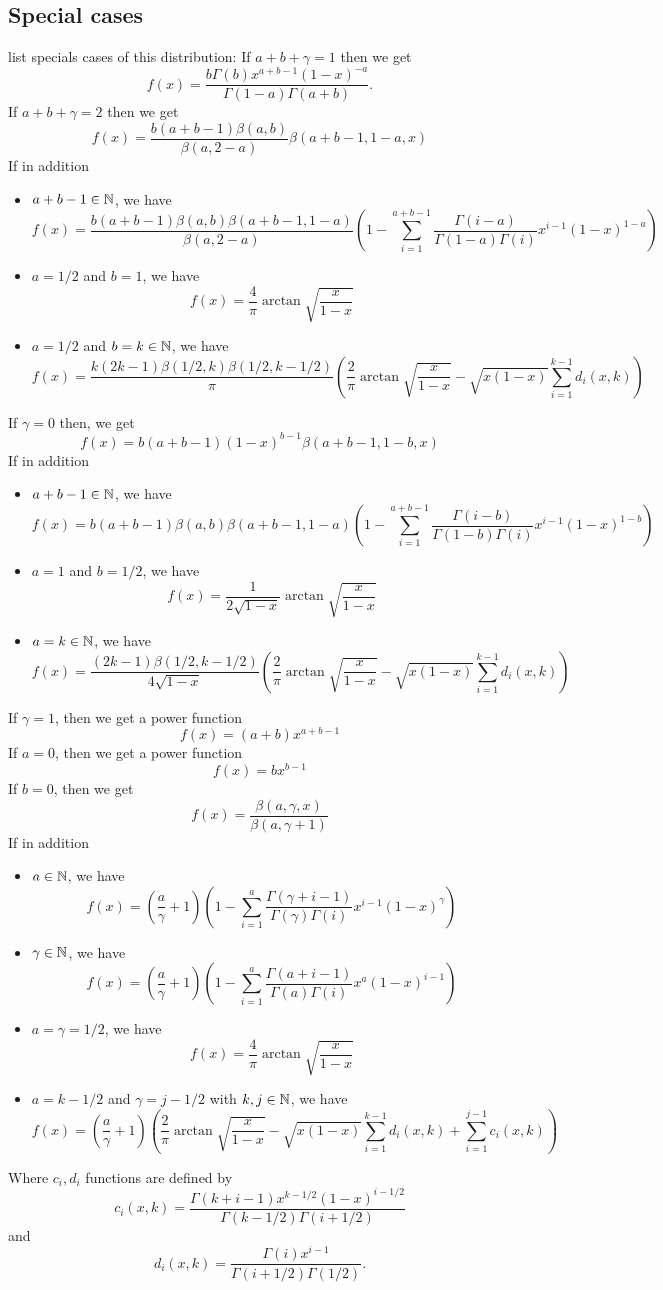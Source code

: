 \subsection{Special cases}
\cite{kotznadara} list specials cases of this distribution:
If $a+b+\gamma=1$ then we get 
$$
f(x) = \frac{b\Gamma(b)x^{a+b-1}(1-x)^{-a}}{\Gamma(1-a)\Gamma(a+b)}.
$$
If $a+b+\gamma=2$ then we get
$$
f(x) = \frac{b(a+b-1)\beta(a,b)}{\beta(a,2-a)}\beta(a+b-1,1-a,x)
$$
If in addition
\begin{itemize}
\item  $a+b-1\in\mathbb N$, we have
$$
f(x) = \frac{b(a+b-1)\beta(a,b)\beta(a+b-1,1-a)}{\beta(a,2-a)} \left(1- \sum_{i=1}^{a+b-1}\frac{\Gamma(i-a)}{\Gamma(1-a)\Gamma(i)} x^{i-1}(1-x)^{1-a} \right)
$$
\item  $a=1/2$ and $b=1$, we have
$$
f(x) = \frac{4}{\pi}\arctan\sqrt{\frac{x}{1-x}}
$$
\item  $a=1/2$ and $b=k\in\mathbb N$, we have
$$
f(x) = \frac{k(2k-1)\beta(1/2,k)\beta(1/2,k-1/2)}{\pi}\left(\frac{2}{\pi}\arctan\sqrt{\frac{x}{1-x}} -\sqrt{x(1-x)}\sum_{i=1}^{k-1}d_i(x,k) \right)
$$
\end{itemize}
If $\gamma=0$ then, we get
$$
f(x) = b(a+b-1)(1-x)^{b-1}\beta(a+b-1,1-b,x)
$$
If in addition
\begin{itemize}
\item  $a+b-1\in\mathbb N$, we have
$$
f(x) = b(a+b-1)\beta(a,b)\beta(a+b-1,1-a) \left(1- \sum_{i=1}^{a+b-1}\frac{\Gamma(i-b)}{\Gamma(1-b)\Gamma(i)} x^{i-1}(1-x)^{1-b} \right)
$$
\item $a=1$ and $b=1/2$, we have
$$
f(x) = \frac{1}{2\sqrt{1-x}}\arctan\sqrt{\frac{x}{1-x}}
$$
\item $a=k\in\mathbb N$, we have
$$
f(x) = \frac{(2k-1)\beta(1/2,k-1/2)}{4\sqrt{1-x}}\left(\frac{2}{\pi}\arctan\sqrt{\frac{x}{1-x}} -\sqrt{x(1-x)}\sum_{i=1}^{k-1}d_i(x,k) \right)
$$
\end{itemize}
If $\gamma=1$, then we get a power function
$$
f(x) = (a+b)x^{a+b-1}
$$
If $a=0$, then we get a power function 
$$
f(x) = bx^{b-1}
$$
If $b=0$, then we get
$$
f(x) = \frac{\beta(a,\gamma,x)}{\beta(a,\gamma+1)}
$$
If in addition
\begin{itemize}
\item  $a\in\mathbb N$, we have
$$
f(x) = \left(\frac{a}{\gamma}+1\right)\left( 1-\sum_{i=1}^a\frac{\Gamma(\gamma+i-1)}{\Gamma(\gamma)\Gamma(i)}x^{i-1}(1-x)^{\gamma} \right)
$$
\item  $\gamma\in\mathbb N$, we have
$$
f(x) = \left(\frac{a}{\gamma}+1\right)\left( 1-\sum_{i=1}^a\frac{\Gamma(a+i-1)}{\Gamma(a)\Gamma(i)}x^a(1-x)^{i-1} \right)
$$
\item $a=\gamma=1/2$, we have
$$
f(x) = \frac{4}{\pi}\arctan\sqrt{\frac{x}{1-x}}
$$
\item $a=k-1/2$ and $\gamma=j-1/2$ with $k,j\in\mathbb N$, we have
$$
f(x) = \left(\frac{a}{\gamma}+1\right) \left(\frac{2}{\pi}\arctan\sqrt{\frac{x}{1-x}} -\sqrt{x(1-x)}\sum_{i=1}^{k-1}d_i(x,k)+\sum_{i=1}^{j-1}c_i(x,k) \right)
$$
\end{itemize}
Where $c_i, d_i$ functions are defined by
$$
c_i(x,k) = \frac{\Gamma(k+i-1)x^{k-1/2}(1-x)^{i-1/2}}{\Gamma(k-1/2)\Gamma(i+1/2)}
$$
and
$$
d_i(x,k) = \frac{\Gamma(i)x^{i-1}}{\Gamma(i+1/2)\Gamma(1/2)}.
$$


